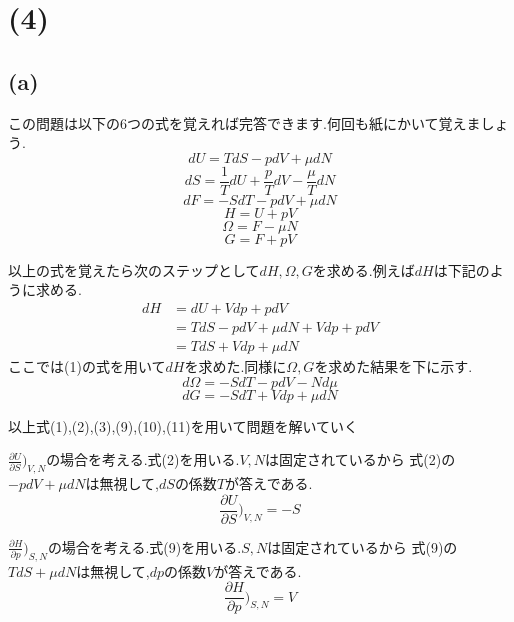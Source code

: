 \section*{(4)}
\subsection*{(a)}
この問題は以下の6つの式を覚えれば完答できます.何回も紙にかいて覚えましょう.
\begin{equation}
dU = TdS-pdV+\mu dN
\end{equation}
\begin{equation}
dS = \frac{1}{T}dU+\frac{p}{T}dV-\frac{\mu}{T}dN
\end{equation}
\begin{equation}
dF = -SdT-pdV+\mu dN
\end{equation}
\begin{equation}
H = U + pV
\end{equation}
\begin{equation}
\Omega = F - \mu N
\end{equation}
\begin{equation}
G = F + pV
\end{equation}

以上の式を覚えたら次のステップとして$dH,\Omega,G$を求める.例えば$dH$は下記のように求める.
\begin{align}
  dH
  &=dU + Vdp + pdV\\
  &=TdS-pdV+\mu dN + Vdp + pdV\\
  &=TdS + Vdp +\mu dN 
\end{align}
ここでは(1)の式を用いて$dH$を求めた.同様に$\Omega,G$を求めた結果を下に示す.
\begin{equation}
d\Omega = -SdT-pdV-Nd \mu
\end{equation}
\begin{equation}
  dG = -SdT+Vdp+\mu dN
\end{equation}

\color{blue}以上式(1),(2),(3),(9),(10),(11)を用いて問題を解いていく\color{black}

$\frac{\partial U}{\partial S}\big)_{V,N}$の場合を考える.式(2)を用いる.$V,N$は固定されているから
式(2)の$-pdV+\mu dN$は無視して,$dS$の係数$T$が答えである.
\begin{equation}
  \frac{\partial U}{\partial S}\big)_{V,N} = -S \tag{Answer-1}
\end{equation}

$\frac{\partial H}{\partial p}\big)_{S,N}$の場合を考える.式(9)を用いる.$S,N$は固定されているから
式(9)の$TdS + \mu dN $は無視して,$dp$の係数$V$が答えである.
\begin{equation}
  \frac{\partial H}{\partial p}\big)_{S,N} = V \tag{Answer-2}
\end{equation}

